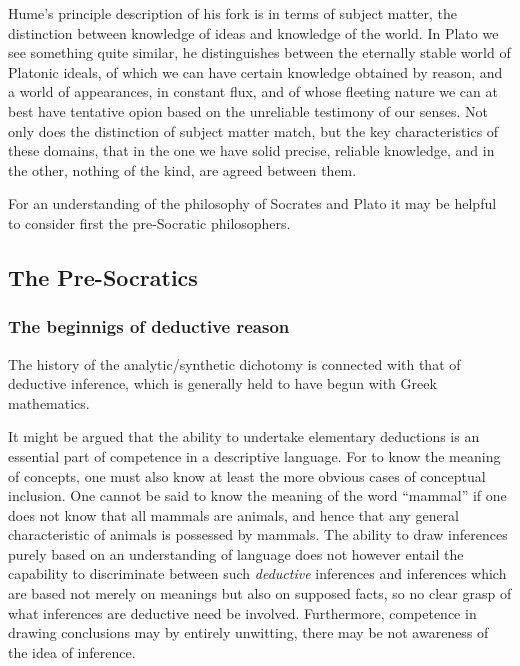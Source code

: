 Hume's principle description of his fork is in terms of subject
matter, the distinction between knowledge of ideas and knowledge of
the world. 
In Plato we see something quite similar, he distinguishes between the
eternally stable world of Platonic ideals, of which we can have
certain knowledge obtained by reason, and a world of appearances, in
constant flux, and of whose fleeting nature we can at best have
tentative opion based on the unreliable testimony of our senses.
Not only does the distinction of subject matter match, but the key
characteristics of these domains, that in the one we have solid
precise, reliable knowledge, and in the other, nothing of the kind,
are agreed between them.

For an understanding of the
philosophy of Socrates and Plato it may be helpful to consider first
the pre-Socratic philosophers.

\subsection{The Pre-Socratics}

\subsubsection{The beginnigs of deductive reason}

The history of the analytic/\-synthetic dichotomy is connected with that
of deductive inference, which is generally held to have begun with
Greek mathematics.

It might be argued that the ability to undertake elementary
deductions is an essential part of competence in a descriptive
language.
For to know the meaning of concepts, one must also know at least the
more obvious cases of conceptual inclusion.
One cannot be said to know the meaning of the word ``mammal'' if one
does not know that all mammals are animals, and hence that any general
characteristic of animals is possessed by mammals.
The ability to draw inferences purely based on an understanding of
language does not however entail the capability to discriminate
between such \emph{deductive} inferences and inferences which are
based not merely on meanings but also on supposed facts, so no clear
grasp of what inferences are deductive need be involved.
Furthermore, competence in drawing conclusions may by entirely
unwitting, there may be not awareness of the idea of inference.

